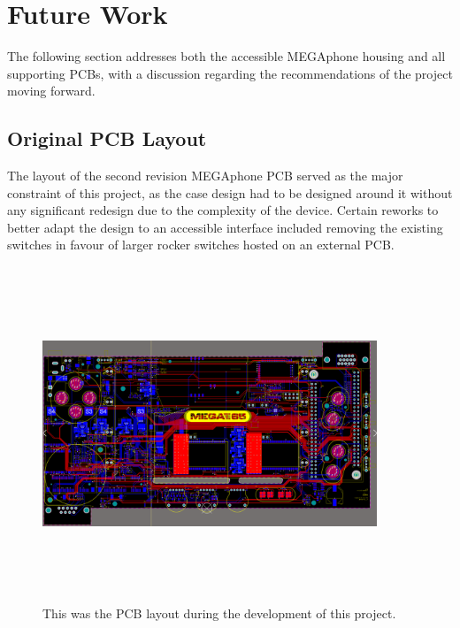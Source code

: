 \section{Future Work}
The following section addresses both the accessible MEGAphone housing and all supporting PCBs, with a discussion regarding the recommendations of the project moving forward.

\subsection{Original PCB Layout}
The layout of the second revision MEGAphone PCB served as the major constraint of this project, as the case design had to be designed around it without any significant redesign due to the complexity of the device. 
Certain reworks to better adapt the design to an accessible interface included removing the existing switches in favour of larger rocker switches hosted on an external PCB.

\begin{figure} [h]
\begin{centering}
\includegraphics[width=10cm,height=10cm,keepaspectratio]{Figures/pcb_original.png}
\caption{This was the PCB layout during the development of this project.}
\label{fig:ThisFig}
\end{centering}
\end{figure}

